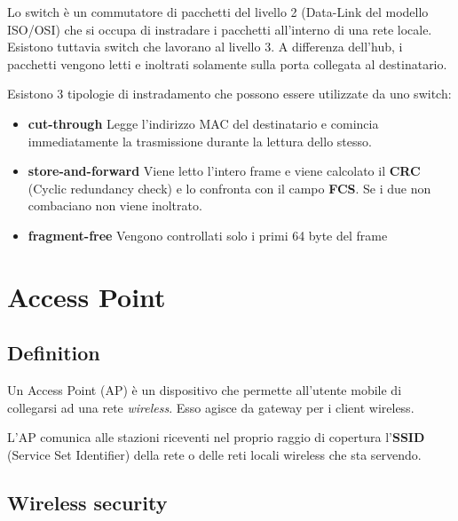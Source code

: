 \documentclass{article}
\begin{document}
Lo switch è un commutatore di pacchetti del livello 2 (Data-Link del modello ISO/OSI)
che si occupa di instradare i pacchetti all'interno di una rete locale.
Esistono tuttavia switch che lavorano al livello 3.
A differenza dell'hub, i pacchetti vengono letti e inoltrati solamente sulla porta collegata al destinatario.

Esistono 3 tipologie di instradamento che possono essere utilizzate da uno switch:

\begin{itemize}
    \item \textbf{cut-through} Legge l'indirizzo MAC del destinatario e comincia immediatamente la trasmissione
        durante la lettura dello stesso.
    \item \textbf{store-and-forward} Viene letto l'intero frame e viene calcolato il \textbf{CRC} (Cyclic redundancy check)
        e lo confronta con il campo \textbf{FCS}. Se i due non combaciano non viene inoltrato.
    \item \textbf{fragment-free} Vengono controllati solo i primi 64 byte del frame
\end{itemize}



\section{Access Point}

\subsection{Definition}

Un Access Point (AP) è un dispositivo che permette all'utente mobile di collegarsi ad una rete
\textit{wireless}. Esso agisce da gateway per i client wireless.

L'AP comunica alle stazioni riceventi nel proprio raggio di copertura l'\textbf{SSID} (Service Set Identifier)
della rete o delle reti locali wireless che sta servendo.

\pagebreak

\subsection{Wireless security}
\end{document}
